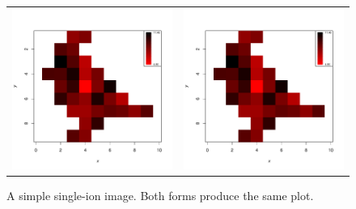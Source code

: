 \documentclass{article}
\begin{document}
\begin{figure}
\begin{center}
\begin{tabular}{cc}
\includegraphics{Cardinal-plotting-021}
&
\includegraphics{Cardinal-plotting-022}
\end{tabular}
\caption{\small A simple single-ion image. Both forms produce the same plot.}
\end{center}
\end{figure}
\end{document}
